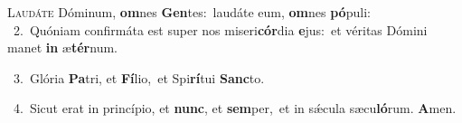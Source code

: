 \lettrine{\initial\textcolor{\initialcolor}{L}}{audáte} Dóminum, \textbf{om}\-nes \textbf{Gen}\-tes:~\star laudáte eum, \textbf{om}\-nes \textbf{pó}\-puli:\\
{\numbfont\textcolor{\numbcolor}{~2.}}~Quóniam confirmáta est super nos miseri\-\textbf{cór}\-dia \textbf{e}\-jus:~\star et véritas Dómini manet \textbf{in} æ\-\textbf{tér}\-num.\par
{\numbfont\textcolor{\numbcolor}{~3.}}~Glória \textbf{Pa}\-tri, et \textbf{Fí}\-lio,~\star et Spi\-\textbf{rí}\-tui \textbf{Sanc}\-to.\par
{\numbfont\textcolor{\numbcolor}{~4.}}~Sicut erat in princípio, et \textbf{nunc}\-, et \textbf{sem}\-per,~\star et in sǽcula sæcu\-\textbf{ló}\-rum. \textbf{A}\-men.\par
